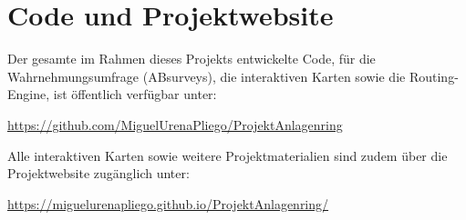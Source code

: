 \documentclass[a4paper,12pt]{article}
\begin{document}
\section{Code und Projektwebsite}

Der gesamte im Rahmen dieses Projekts entwickelte Code, für die Wahrnehmungsumfrage (ABsurveys), die interaktiven Karten sowie die Routing-Engine, ist öffentlich verfügbar unter:
\begin{center}
	\url{https://github.com/MiguelUrenaPliego/ProjektAnlagenring}
\end{center}
Alle interaktiven Karten sowie weitere Projektmaterialien sind zudem über die Projektwebsite zugänglich unter:
\begin{center}
	\url{https://miguelurenapliego.github.io/ProjektAnlagenring/}
\end{center}

\clearpage
\printbibliography
\end{document}
